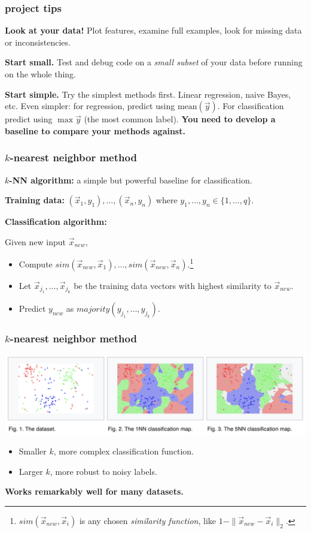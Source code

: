 \documentclass[handout,compress]{beamer}
\begin{document}
\begin{frame}
		\frametitle{project tips}
		\textbf{Look at your data!} Plot features, examine full examples, look for missing data or inconsistencies. 
		
		\textbf{Start small.} Test and debug code on a \emph{small subset} of your data before running on the whole thing. 
		
		\textbf{Start simple.} Try the simplest methods first. Linear regression, naive Bayes, etc. Even simpler: for regression, predict using $\text{mean}(\vec{y})$. For classification predict using $\max{\vec{y}}$ (the most common label). \textbf{You need to develop a baseline to compare your methods against.}
\end{frame}

\begin{frame}
	\frametitle{$k$-nearest neighbor method}
	\textbf{$k$-NN algorithm:} a simple but powerful baseline for classification.
	
	\textbf{Training data:} $(\vec{x}_1, y_1), \ldots, (\vec{x}_n, y_n)$ where $y_1, \ldots, y_n \in \{1,\ldots, q\}$. 
	
	\textbf{Classification algorithm:}
	
	Given new input $\vec{x}_{new}$,
	\begin{itemize}
		\item Compute $sim(\vec{x}_{new}, \vec{x}_1), \ldots, sim(\vec{x}_{new}, \vec{x}_n).$\footnote{$sim(\vec{x}_{new}, \vec{x}_i)$ is any chosen \emph{similarity function}, like $1 - \|\vec{x}_{new} - \vec{x}_i\|_2$.}
		\item Let $\vec{x}_{j_1}, \ldots, \vec{x}_{j_k}$ be the training data vectors with highest similarity to $\vec{x}_{new}$. 
		\item Predict $y_{new}$ as $majority(y_{j_1}, \ldots, y_{j_k})$.
	\end{itemize}
\end{frame}

\begin{frame}
	\frametitle{$k$-nearest neighbor method}
	\begin{center}
		\includegraphics[width=\textwidth]{knn.png}
	\end{center}
	\begin{itemize}
		\item Smaller $k$, more complex classification function.
		\item Larger $k$, more robust to noisy labels. 
	\end{itemize}
\begin{center}
	\textbf{Works remarkably well for many datasets.}
\end{center}
\end{frame}
\end{document}
